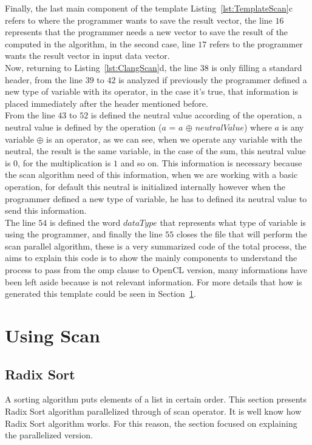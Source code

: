 \documentclass[Ingles]{ic-tese-v1}
\newcommand{\rsec}[1]{Section~\ref{sec:#1}}
\newcommand{\rlst}[1]{Listing~\ref{lst:#1}}
\begin{document}
Finally, the last main component of the template \rlst{TemplateScan}{c} refers to where the programmer wants to save the result vector, the line $16$ represents that the programmer needs a new vector to save the result of the computed in the algorithm, in the second case, line $17$ refers to the programmer wants the result vector in input data vector.\\
Now, returning to \rlst{ClangScan}{d}, the line $38$ is only filling a standard header, from the line $39$ to $42$ is analyzed if previously the programmer defined a new type of variable with its operator, in the case it's true, that information is placed immediately after the header mentioned before.\\From the line $43$ to $52$ is defined the neutral value according of the operation, a neutral value is defined by the operation ($a$ = $a$ $\oplus$ $neutralValue$) where $a$ is any variable $\oplus$ is an operator, as we can see, when we operate any variable with the neutral, the result is the same variable, in the case of the sum, this neutral value is $0$, for the multiplication is $1$ and so on. This information is necessary because the scan algorithm need of this information, when we are working with a basic operation, for default this neutral is initialized internally however when the programmer defined a new type of variable, he has to defined its neutral value to send this information.\\
The line $54$ is defined the word $dataType$ that represents what type of variable is using the programmer, and finally the line $55$ closes the file that will perform the scan parallel algorithm, these is a very summarized code of the total process, the aims to explain this code is to show the mainly components to understand the process to pass from the omp clause to OpenCL version, many informations have been left aside because is not relevant information. For more details that how is generated this template could be seen in \rsec{ScanUse}.


\chapter{Using Scan}
\label{sec:ScanUse}

\section{Radix Sort}
\label{sec:Quicksort}

A sorting algorithm puts elements of a list in certain order. This section
presents Radix Sort algorithm parallelized through of scan operator. It is
well know how Radix Sort algorithm works.  For this reason, the section
focused on explaining the parallelized version.
\end{document}
